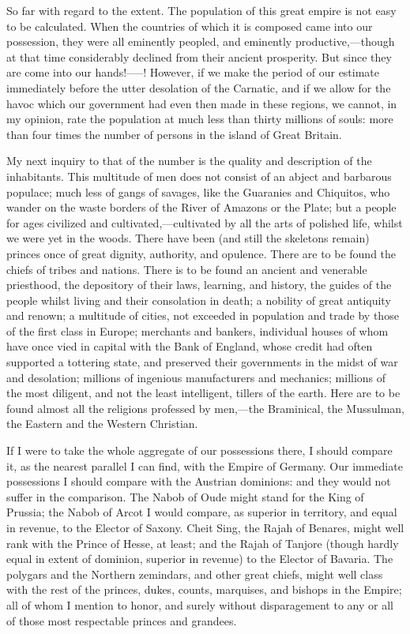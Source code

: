 So far with regard to the extent. The population of this great empire is not easy to be calculated. When the countries of which it is composed came into our possession, they were all eminently peopled, and eminently productive,—though at that time considerably declined from their ancient prosperity. But since they are come into our hands!—--! However, if we make the period of our estimate immediately before the utter desolation of the Carnatic, and if we allow for the havoc which our government had even then made in these regions, we cannot, in my opinion, rate the population at much less than thirty millions of souls: more than four times the number of persons in the island of Great Britain.

My next inquiry to that of the number is the quality and description of the inhabitants. This multitude of men does not consist of an abject and barbarous populace; much less of gangs of savages, like the Guaranies and Chiquitos, who wander on the waste borders of the River of Amazons or the Plate; but a people for ages civilized and cultivated,—cultivated by all the arts of polished life, whilst we were yet in the woods. There have been (and still the skeletons remain) princes once of great dignity, authority, and opulence. There are to be found the chiefs of tribes and nations. There is to be found an ancient and venerable priesthood, the depository of their laws, learning, and history, the guides of the people whilst living and their consolation in death; a nobility of great antiquity and renown; a multitude of cities, not exceeded in population and trade by those of the first class in Europe; merchants and bankers, individual houses of whom have once vied in capital with the Bank of England, whose credit had often supported a tottering state, and preserved their governments in the midst of war and desolation; millions of ingenious manufacturers and mechanics; millions of the most diligent, and not the least intelligent, tillers of the earth. Here are to be found almost all the religions professed by men,—the Braminical, the Mussulman, the Eastern and the Western Christian.

If I were to take the whole aggregate of our possessions there, I should compare it, as the nearest parallel I can find, with the Empire of Germany. Our immediate possessions I should compare with the Austrian dominions: and they would not suffer in the comparison. The Nabob of Oude might stand for the King of Prussia; the Nabob of Arcot I would compare, as superior in territory, and equal in revenue, to the Elector of Saxony. Cheit Sing, the Rajah of Benares, might well rank with the Prince of Hesse, at least; and the Rajah of Tanjore (though hardly equal in extent of dominion, superior in revenue) to the Elector of Bavaria. The polygars and the Northern zemindars, and other great chiefs, might well class with the rest of the princes, dukes, counts, marquises, and bishops in the Empire; all of whom I mention to honor, and surely without disparagement to any or all of those most respectable princes and grandees.

